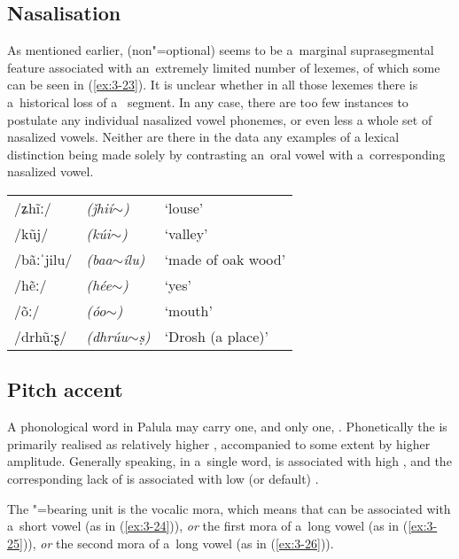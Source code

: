 \subsection{Nasalisation}
\label{subsec:3-4-2}


As mentioned earlier, (non"=optional)  seems to be a~marginal suprasegmental feature associated with an~extremely limited number of lexemes, of which some can be seen in (\ref{ex:3-23}). It is unclear whether in all those lexemes there is a~historical loss of a~ segment. In any case, there are too few instances to postulate any individual nasalized vowel phonemes, or even less a whole set of nasalized vowels. Neither are there in the data any examples of a lexical distinction being made solely by contrasting an~oral vowel with a~corresponding nasalized vowel. 


\begin{exe}
\extab
\label{ex:3-23}
\begin{tabularx}{\textwidth}{ l l l }
/ʑh\~{i}ː/ &
\textit{(ǰhií$\sim$) } &
`louse'\\
/kũj/ &
\textit{(kúi$\sim$)} &
`valley'\\
/bãːˈjilu/ &
\textit{(baa$\sim$ílu)} &
`made of oak wood'\\
/hẽː/ &
\textit{(hée$\sim$)} &
`yes'\\
/õː/ &
\textit{(óo$\sim$)} &
`mouth'\\
/drhũːʂ/ &
\textit{(dhrúu$\sim$ṣ)} &
`Drosh (a place)'\\
\end{tabularx}
\end{exe}

\subsection{Pitch accent}
\label{subsec:3-4-3}

A phonological word in Palula may carry one, and only one, . Phonetically the  is primarily realised as relatively higher , accompanied to some extent by higher amplitude. Generally speaking, in a~single word,  is associated with high , and the corresponding lack of  is associated with low (or default) . 

The "=bearing unit is the vocalic mora, which means that  can be associated with a~short vowel (as in (\ref{ex:3-24})), \textit{or} the first mora of a~long vowel (as in (\ref{ex:3-25})), \textit{or} the second mora of a~long vowel (as in (\ref{ex:3-26})).


